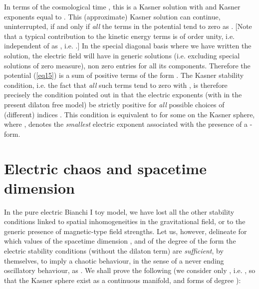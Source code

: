 \documentclass[a4paper,12pt]{article}
\begin{document}
In terms of the cosmological time \coordHE{},
this is a Kasner solution  
with \coordHE{} and Kasner exponents
equal to \coordHE{}.  
This (approximate) Kasner solution can continue, uninterrupted, if and 
only if {\it all} the terms in the potential \coordHE{} tend to zero 
as \coordHE{}. [Note that a typical contribution to the kinetic 
energy terms \coordHE{} is of order 
unity, i.e. independent of \myHighlight{$\tau$}\coordHE{} as \myHighlight{$\tau \rightarrow \infty$}\coordHE{}, i.e. \coordHE{}.] In the special diagonal basis where we have
written the solution,
the electric field \coordHE{} will have in 
generic solutions (i.e. excluding special solutions of zero measure), 
non zero entries for all its components. 
Therefore the potential (\ref{eq15}) is a sum of positive terms of the 
form \coordHE{}. The Kasner stability 
condition, i.e. the fact that {\it all} such terms tend to zero with 
\coordHE{}, is therefore precisely the condition pointed out in \cite{dh1} 
that the electric exponents (with \coordHE{} in the present dilaton free model) be strictly positive 
for {\it all} possible choices of (different) indices \coordHE{}. This condition is equivalent to \coordHE{} 
for some \coordHE{} on the Kasner sphere, where
\coordHE{},
denotes the {\it smallest} electric exponent associated with the 
presence of a \myHighlight{$p$}\coordHE{}-form. 

\section{Electric chaos and spacetime dimension}
In the pure electric Bianchi I  toy model,  we have 
lost all the other stability conditions linked to spatial 
inhomogeneities in the gravitational field, or to the 
generic presence of magnetic-type field strengths.
Let us, however, delineate for which values of the spacetime dimension 
\myHighlight{$D = d+1$}\coordHE{}, and of the degree \myHighlight{$p$}\coordHE{} of the form the electric 
stability conditions (without the dilaton term) are {\it 
sufficient}, by themselves, to imply a chaotic behaviour, in the sense 
of a never ending oscillatory behaviour, as \coordHE{}. We shall 
prove the following (we consider only \myHighlight{$d \geq 3$}\coordHE{}, i.e. \coordHE{}, so 
that the Kasner sphere exist as a continuous manifold, and forms of 
degree \myHighlight{$p \leq 3$}\coordHE{}):
\end{document}
